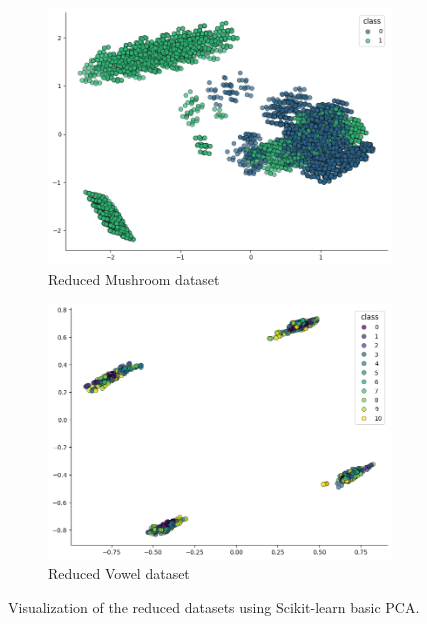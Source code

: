 \begin{figure}[h!]
    \centering
    \begin{subfigure}[b]{0.45\textwidth}
        \centering
        \includegraphics[width=\textwidth]{figures/mushroom_sklearn_pca.png}
        \caption{Reduced Mushroom dataset}
        \label{subfig:mushroom_sklearn_pca}
    \end{subfigure}
    \hfill
    \begin{subfigure}[b]{0.45\textwidth}
        \centering
        \includegraphics[width=\textwidth]{figures/vowel_sklearn_pca.png}
        \caption{Reduced Vowel dataset}
        \label{subfig:vowel_sklearn_pca}
    \end{subfigure}
    
    \caption{Visualization of the reduced datasets using Scikit-learn basic PCA.}
    \label{fig:sklearn_pca_datasets}
\end{figure}

